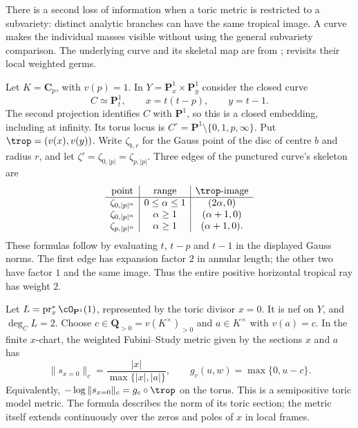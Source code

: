There is a second loss of information when a toric metric is restricted
to a subvariety: distinct analytic branches can have the same tropical
image.  A curve makes the individual masses visible without using the
general subvariety comparison.  The underlying curve and its skeletal
map are from \cite[Examples~2.6, 8.7 and~8.11]{BPR12};
\cite[Example~10.1]{Lin26} revisits their local weighted germs.

\begin{example}
\label{ex:ch19-toric-overlapping-branches}
Let $K=\mathbf C_p$, with $v(p)=1$.  In
$Y=\mathbf P^1_x\times\mathbf P^1_y$ consider the closed curve
\[
 C\simeq\mathbf P^1_t,\qquad x=t(t-p),\qquad y=t-1.
\]
The second projection identifies $C$ with $\mathbf P^1$, so this is a
closed embedding, including at infinity.  Its torus locus is
$C^\circ=\mathbf P^1\setminus\{0,1,p,\infty\}$.
Put $\trop=(v(x),v(y))$.  Write $\zeta_{b,r}$ for the Gauss point of
the disc of centre $b$ and radius $r$, and let
$\zeta'=\zeta_{0,|p|}=\zeta_{p,|p|}$.
Three edges of the punctured curve's skeleton are
\begin{equation}
\label{eq:ch19-overlap-edge-map}
\begin{array}{c|c|c}
 \text{point}&\text{range}&\trop\text{-image}\\ \hline
 \zeta_{0,|p|^\alpha}&0\leq\alpha\leq1&(2\alpha,0)\\
 \zeta_{0,|p|^\alpha}&\alpha\geq1&(\alpha+1,0)\\
 \zeta_{p,|p|^\alpha}&\alpha\geq1&(\alpha+1,0).
\end{array}
\end{equation}
These formulas follow by evaluating $t$, $t-p$ and $t-1$ in the
displayed Gauss norms.  The first edge has expansion factor $2$ in
annular length; the other two have factor $1$ and the same image.
Thus the entire positive horizontal tropical ray has weight $2$.

Let $L=\operatorname{pr}_x^*\cO_{\mathbf P^1}(1)$, represented by the
toric divisor $x=0$.  It is nef on $Y$, and $\deg_C L=2$.
Choose $c\in\mathbf Q_{>0}=v(K^\times)_{>0}$ and
$a\in K^\times$ with $v(a)=c$.  In the finite $x$-chart, the weighted
Fubini--Study metric given by the sections $x$ and $a$ has
\[
 \|s_{x=0}\|_c=\frac{|x|}{\max\{|x|,|a|\}},
 \qquad
 g_c(u,w)=\max\{0,u-c\}.
\]
Equivalently, $-\log\|s_{x=0}\|_c=g_c\circ\trop$ on the torus.
This is a semipositive toric model metric.  The formula describes the
norm of its toric section; the metric itself extends continuously over
the zeros and poles of $x$ in local frames.


\end{example}
